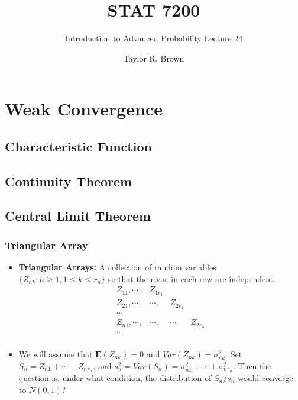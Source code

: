\documentclass[handout]{beamer}
\title{STAT 7200}
\subtitle{Introduction to Advanced Probability \newline Lecture 24}
\author{Taylor R. Brown}
\institute{}
\date{}
\newcommand{\BE}{\mathbf{E}}
\begin{document}
\frame{\titlepage}


\section[Outline]{}
\frame{\tableofcontents}

\section{Weak Convergence}


\subsection{Characteristic Function}
\subsection{Continuity Theorem} 
\subsection{Central Limit Theorem}
 
  
     \frame
{
  \frametitle{Triangular Array}
   \begin{itemize}


\item<1->\textbf{Triangular Arrays:} A collection of random variables $\{Z_{nk}: n\geq 1, 1\leq k \leq r_n\}$ so that the r.v.s. in each row are independent. 
$$\begin{array}{llll}
Z_{11},\cdots, & Z_{1r_1} & \\
Z_{21},\cdots,  & \cdots, &  Z_{2 r_2} \\
\cdots \\
Z_{n1},\cdots,  & \cdots, & \cdots  &  Z_{2 r_n} \\
\cdots \\
\end{array}$$
\item<3-> We will assume that $\BE(Z_{nk})=0$ and $Var(Z_{nk}) =\sigma_{nk}^2$. Set $S_n=Z_{n1}+\cdots+Z_{nr_n}$, and $s_n^2=Var(S_{n})=\sigma^2_{n1}+\cdots+\sigma^2_{nr_n}$. Then the question is, under what condition, the distribution of $S_n/s_n$ would converge to $N(0,1)$? 

\end{itemize}
 }
 
\end{document}
